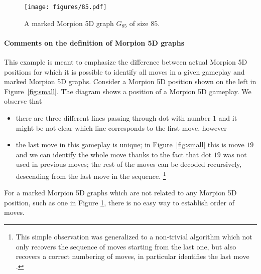 \begin{figure}[h]
    \centering
    \texttt{[image: figures/85.pdf]}
     \caption{
     A marked Morpion 5D graph $G_{85}$ of size $85$.
	}
    \label{fig:85}
\end{figure}

\paragraph*{Comments on the definition of Morpion 5D graphs}


\begin{example}
This example is meant to emphasize the difference between 
actual Morpion 5D positions for which it is possible to identify all moves in a given gameplay and marked Morpion 5D graphs.
Consider a Morpion 5D position shown on the left in Figure~\ref{fig:small}. %
The diagram shows a position of a Morpion 5D gameplay.
We observe that %
  \begin{itemize}
    \item   there are three different lines passing through dot with number $1$ and it might be not clear which line corresponds to the first move, however
    \item   the last move in this gameplay is unique; in Figure~\ref{fig:small} this is move $19$ and we can identify the whole move thanks to the fact  that dot $19$ was not used in previous moves; the rest of the moves can be decoded recursively, descending from the last move in the sequence. \footnote{This simple observation was generalized to a non-trivial algorithm which not only recovers the sequence of moves starting from the last one, but also recovers a correct numbering of moves, in particular identifies the last move \cite{demaine}.} %
  \end{itemize}
For a marked Morpion 5D graphs which are not related to any Morpion 5D position, such as one in Figure \ref{fig:85}, there is no easy way to establish order of moves.
\end{example}


